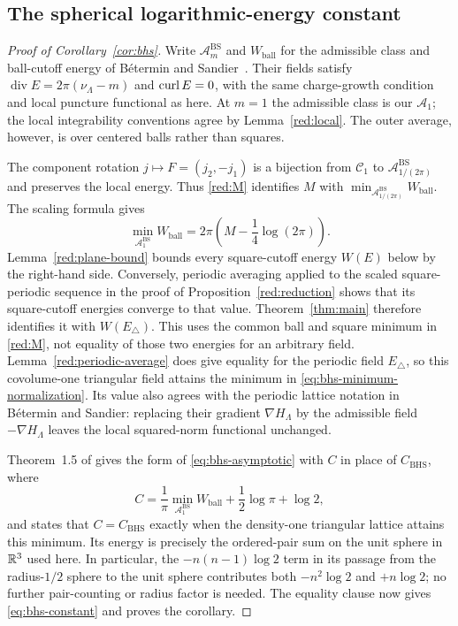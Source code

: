 \subsection{The spherical logarithmic-energy constant}

\begin{proof}[Proof of Corollary~\ref{cor:bhs}]
Write $\mathcal A_m^{\mathrm{BS}}$ and $W_{\mathrm{ball}}$ for the
admissible class and ball-cutoff energy of B\'etermin and
Sandier~\cite[Definitions~2.1--2.4]{BeterminSandier2018}. Their fields
satisfy $\operatorname{div}E=2\pi(\nu_\Lambda-m)$ and $\operatorname{curl} E=0$,
with the same charge-growth condition and local puncture functional as
here. At $m=1$ the admissible class is our $\mathcal A_1$; the local
integrability conventions agree by Lemma~\ref{red:local}. The outer
average, however, is over centered balls rather than squares.

The component rotation $j\mapsto F=(j_2,-j_1)$ is a bijection from
$\mathcal C_1$ to $\mathcal A_{1/(2\pi)}^{\mathrm{BS}}$ and preserves
the local energy.
Thus \eqref{red:M} identifies $M$ with
$\min_{\mathcal A_{1/(2\pi)}^{\mathrm{BS}}}W_{\mathrm{ball}}$.
The scaling formula \cite[equation~(2.4)]{BeterminSandier2018} gives
\begin{equation}\label{eq:bhs-minimum-normalization}
\min_{\mathcal A_1^{\mathrm{BS}}}W_{\mathrm{ball}}
=2\pi\left(M-\frac14\log(2\pi)\right).
\end{equation}
Lemma~\ref{red:plane-bound} bounds every square-cutoff energy $W(E)$
below by the right-hand side. Conversely, periodic averaging applied
to the scaled square-periodic sequence in the proof of
Proposition~\ref{red:reduction} shows that its square-cutoff energies
converge to that value. Theorem~\ref{thm:main} therefore identifies it
with $W(E_\triangle)$. This uses the common ball and square minimum in
\eqref{red:M}, not equality of those two energies for an arbitrary
field. Lemma~\ref{red:periodic-average} does give equality for the
periodic field $E_\triangle$, so this covolume-one triangular field
attains the minimum in \eqref{eq:bhs-minimum-normalization}. Its value
also agrees with the periodic lattice notation in B\'etermin and
Sandier: replacing their gradient $\nabla H_\Lambda$ by the admissible
field $-\nabla H_\Lambda$ leaves the local squared-norm functional
unchanged.

Theorem~1.5 of \cite{BeterminSandier2018} gives the form of
\eqref{eq:bhs-asymptotic} with $C$ in place of $C_{\mathrm{BHS}}$, where
\[
C=\frac1\pi\min_{\mathcal A_1^{\mathrm{BS}}}W_{\mathrm{ball}}
       +\frac12\log\pi+\log2,
\]
and states that $C=C_{\mathrm{BHS}}$ exactly when the density-one
triangular lattice attains this minimum. Its energy is precisely the
ordered-pair sum on the unit sphere in $\mathbb R^3$ used here. In particular,
the $-n(n-1)\log2$ term in its passage from the radius-$1/2$ sphere to
the unit sphere contributes both $-n^2\log2$ and $+n\log2$; no further
pair-counting or radius factor is needed. The equality clause now gives
\eqref{eq:bhs-constant} and proves the corollary.
\end{proof}
